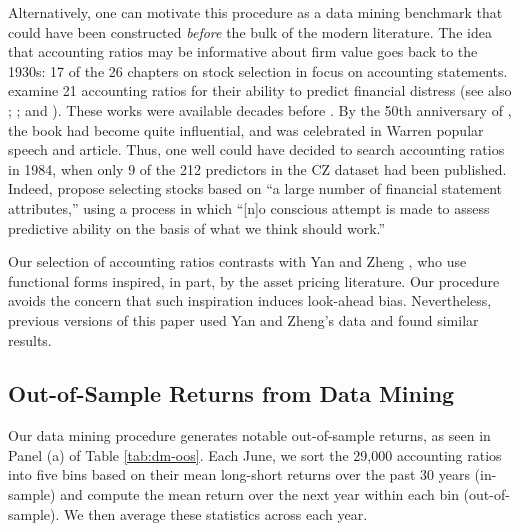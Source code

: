 Alternatively, one can motivate this procedure as a data mining benchmark that could have been constructed \emph{before} the bulk of the modern literature. The idea that accounting ratios may be informative about firm value goes back to the 1930s: 17 of the 26 chapters on stock selection in \citet{graham1934securityanalysis} focus on accounting statements. \citet{smith1935changes} examine 21 accounting ratios for their ability to predict financial distress (see also \citealt{ramser1931}; \citealt{fitzpatrick1932}; and \citealt{merwin1942}). These works were available decades before \citet{fama1973risk}. By the 50th anniversary of \citet{graham1934securityanalysis}, the book had become quite influential, and was celebrated in Warren  popular speech and article. Thus, one well could have decided to search accounting ratios in 1984, when only 9 of the 212 predictors in the CZ dataset had been published. Indeed, \citet{ou1989financial} propose selecting stocks based on ``a large number of financial statement attributes,'' using a process in which ``[n]o conscious attempt is made to assess predictive ability on the basis of what we think should work.''

Our selection of accounting ratios contrasts with Yan and Zheng \citeyearpar{yan2017fundamental}, who use functional forms inspired, in part, by the asset pricing literature. Our procedure avoids the concern that such inspiration induces look-ahead bias. Nevertheless, previous versions of this paper used Yan and Zheng's data and found similar results. 

\subsection{Out-of-Sample Returns from Data Mining}\label{sec:dm-datasum}

Our data mining procedure generates notable out-of-sample returns, as seen in Panel (a) of Table \ref{tab:dm-oos}.  Each June, we sort the 29,000 accounting ratios into five bins based on their mean long-short returns over the past 30 years (in-sample) and compute the mean return over the next year within each bin (out-of-sample).  We then average these statistics across each year.  

